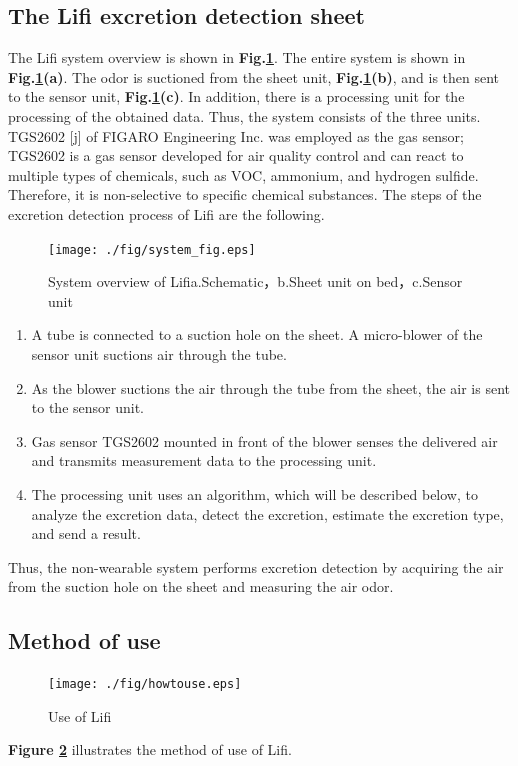 \documentclass[publish,JRM,paper]{jaciiiarticle}
\begin{document}
\subsection{The Lifi excretion detection sheet}
The Lifi system overview is shown in {\bf Fig.\ref{system}}. The entire system is shown in {\bf Fig.\ref{system}(a)}. The odor is suctioned from the sheet unit, {\bf Fig.\ref{system}(b)}, and is then sent to the sensor unit, {\bf Fig.\ref{system}(c)}. In addition, there is a processing unit for the processing of the obtained data. Thus, the system consists of the three units. TGS2602 [j] of FIGARO Engineering Inc. was employed as the gas sensor; TGS2602 is a gas sensor developed for air quality control and can react to multiple types of chemicals, such as VOC, ammonium, and hydrogen sulfide. Therefore, it is non-selective to specific chemical substances. The steps of the excretion detection process of Lifi are the following.

\begin{figure}[t]
  \centering
  \texttt{[image: ./fig/system\_fig.eps]}
  \caption{System overview of Lifi\newline a.Schematic，b.Sheet unit on bed，c.Sensor unit}
  \label{system}
\end{figure}
\begin{enumerate}
  \item A tube is connected to a suction hole on the sheet. A micro-blower of the sensor unit suctions air through the tube.
  \item As the blower suctions the air through the tube from the sheet, the air is sent to the sensor unit.
  \item Gas sensor TGS2602 mounted in front of the blower senses the delivered air and transmits measurement data to the processing unit.
  \item The processing unit uses an algorithm, which will be described below, to analyze the excretion data, detect the excretion, estimate the excretion type, and send a result.
\end{enumerate}
Thus, the non-wearable system performs excretion detection by acquiring the air from the suction hole on the sheet and measuring the air odor.
\subsection{Method of use}
\begin{figure}[t]
  \centering
  \texttt{[image: ./fig/howtouse.eps]}
  \caption{Use of Lifi}
  \label{howtouse}
\end{figure}
{\bf Figure \ref{howtouse}} illustrates the method of use of Lifi.
\end{document}

